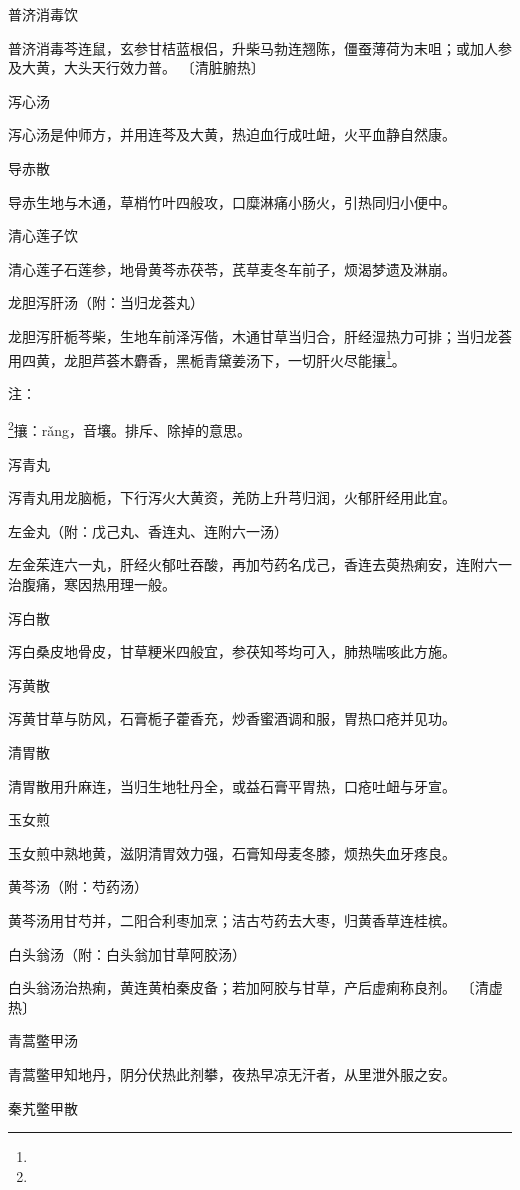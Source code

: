 \documentclass[a4paper,12pt,UTF8,twoside]{ctexbook}
\begin{document}
普济消毒饮

普济消毒芩连鼠，玄参甘桔蓝根侣，升柴马勃连翘陈，僵蚕薄荷为末咀；或加人参及大黄，大头天行效力普。
〔清脏腑热〕

泻心汤

泻心汤是仲师方，并用连芩及大黄，热迫血行成吐衄，火平血静自然康。

导赤散

导赤生地与木通，草梢竹叶四般攻，口糜淋痛小肠火，引热同归小便中。

清心莲子饮

清心莲子石莲参，地骨黄芩赤茯苓，芪草麦冬车前子，烦渴梦遗及淋崩。

龙胆泻肝汤（附：当归龙荟丸）

龙胆泻肝栀芩柴，生地车前泽泻偕，木通甘草当归合，肝经湿热力可排；当归龙荟用四黄，龙胆芦荟木麝香，黑栀青黛姜汤下，一切肝火尽能攘\footnote{}。

注：

\footnote{}攘：rǎng，音壤。排斥、除掉的意思。

泻青丸

泻青丸用龙脑栀，下行泻火大黄资，羌防上升芎归润，火郁肝经用此宜。

左金丸（附：戊己丸、香连丸、连附六一汤）

左金茱连六一丸，肝经火郁吐吞酸，再加芍药名戊己，香连去萸热痢安，连附六一治腹痛，寒因热用理一般。

泻白散

泻白桑皮地骨皮，甘草粳米四般宜，参茯知芩均可入，肺热喘咳此方施。

泻黄散

泻黄甘草与防风，石膏栀子藿香充，炒香蜜酒调和服，胃热口疮并见功。

清胃散

清胃散用升麻连，当归生地牡丹全，或益石膏平胃热，口疮吐衄与牙宣。

玉女煎

玉女煎中熟地黄，滋阴清胃效力强，石膏知母麦冬膝，烦热失血牙疼良。

黄芩汤（附：芍药汤）

黄芩汤用甘芍并，二阳合利枣加烹；洁古芍药去大枣，归黄香草连桂槟。

白头翁汤（附：白头翁加甘草阿胶汤）

白头翁汤治热痢，黄连黄柏秦皮备；若加阿胶与甘草，产后虚痢称良剂。
〔清虚热〕

青蒿鳖甲汤

青蒿鳖甲知地丹，阴分伏热此剂攀，夜热早凉无汗者，从里泄外服之安。

秦艽鳖甲散
\end{document}
